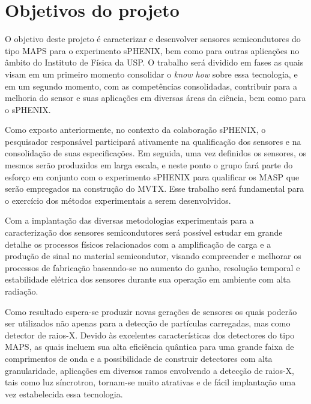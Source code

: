 \chapter{Objetivos do projeto}

O objetivo deste projeto é caracterizar e desenvolver sensores semicondutores do tipo MAPS para o experimento sPHENIX, bem como para outras aplicações no âmbito do Instituto de Física da USP. O trabalho será dividido em fases as quais visam em um primeiro momento consolidar o {\it know how} sobre essa tecnologia, e em um segundo momento, com as competências consolidadas, contribuir para a melhoria do sensor e suas aplicações em diversas áreas da ciência, bem como para o sPHENIX.

Como exposto anteriormente, no contexto da colaboração sPHENIX, o pesquisador responsável participará ativamente na qualificação dos sensores e na consolidação de suas especificações. Em seguida, uma vez definidos os sensores, os mesmos serão produzidos em larga escala, e neste ponto o grupo fará parte do esforço em conjunto com o experimento sPHENIX para qualificar os MASP que serão empregados na construção do MVTX. Esse trabalho será fundamental para o exercício dos métodos experimentais a serem desenvolvidos.

Com a implantação das diversas metodologias experimentais para a caracterização dos sensores semicondutores será possível estudar em grande detalhe os processos físicos relacionados com a amplificação de carga e a produção de sinal no material semicondutor, visando compreender e melhorar os processos de fabricação baseando-se no aumento do ganho, resolução temporal e estabilidade elétrica dos sensores durante sua operação em ambiente com alta radiação. 

Como resultado espera-se produzir novas gerações de sensores os quais poderão ser utilizados não apenas para a detecção de partículas carregadas, mas como detector de raios-X. Devido às excelentes características dos detectores do tipo MAPS, as quais incluem sua alta eficiência quântica para uma grande faixa de comprimentos de onda e a possibilidade de construir detectores com alta granularidade, aplicações em diversos ramos envolvendo a detecção de raios-X, tais como luz síncrotron, tornam-se muito atrativas e de fácil implantação uma vez estabelecida essa tecnologia.

